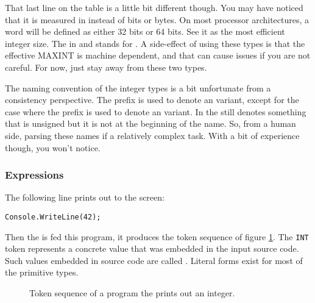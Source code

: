 That last line on the table is a little bit different though. You may have noticed that it is measured in  instead of bits or bytes. On most processor architectures, a word will be defined as either 32 bits or 64 bits. See it as the most efficient integer size. The  in  and  stands for \textsl{}. A side-effect of using these types is that the effective MAXINT is machine dependent, and that can cause  issues if you are not careful. For now, just stay away from these two types.

The naming convention of the integer types is a bit unfortunate from a consistency perspective. The  prefix is used to denote an  variant, except for the  case where the  prefix is used to denote an  variant. In  the  still denotes something that is unsigned but it is not at the beginning of the name. So, from a human side, parsing these names if a relatively complex task. With a bit of experience though, you won't notice.


\subsubsection{Expressions}

The following line prints out  to the screen:
\begin{verbatim}
Console.WriteLine(42);
\end{verbatim}

Then the  is fed this program, it produces the token sequence of figure \ref{fig:primitives:int:tokens}. The \texttt{INT} token represents a concrete  value that was embedded in the input source code. Such values embedded in source code are called . Literal forms exist for most of the primitive types.

\begin{figure}[tbp]
  
  \caption{Token sequence of a program the prints out an integer.}
  \label{fig:primitives:int:tokens}
\end{figure}

